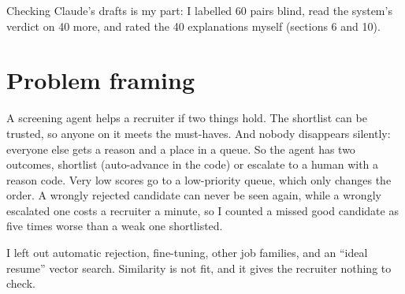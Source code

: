 \documentclass[conference]{styles/acmsiggraph}
\begin{document}
Checking Claude's drafts is my part: I labelled 60 pairs blind, read the system's verdict on 40 more, and rated the 40 explanations myself (sections 6 and 10).

\section{Problem framing}

A screening agent helps a recruiter if two things hold. The shortlist can be trusted, so anyone on it meets the must-haves. And nobody disappears silently: everyone else gets a reason and a place in a queue. So the agent has two outcomes, shortlist (auto-advance in the code) or escalate to a human with a reason code. Very low scores go to a low-priority queue, which only changes the order. A wrongly rejected candidate can never be seen again, while a wrongly escalated one costs a recruiter a minute, so I counted a missed good candidate as five times worse than a weak one shortlisted.

I left out automatic rejection, fine-tuning, other job families, and an ``ideal resume'' vector search. Similarity is not fit, and it gives the recruiter nothing to check.
\end{document}
